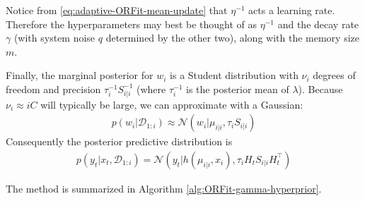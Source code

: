 Notice from \eqref{eq:adaptive-ORFit-mean-update} that $\eta^{-1}$ acts a learning rate. Therefore the hyperparameters may best be thought of as $\eta^{-1}$ and the decay rate $\gamma$ (with system noise $q$ determined by the other two), along with the memory size $m$.

Finally, the marginal posterior for $w_{i}$ is a Student distribution
with $\nu_{i}$ degrees of freedom and precision $\tau_{i}^{-1}S_{i\vert i}^{-1}$
(where $\tau_{i}^{-1}$ is the posterior mean of $\lambda$). Because $\nu_{i}\approx iC$
will typically be large, we can approximate with a Gaussian:
\begin{align}
p\left(w_{i}\vert\mathcal{D}_{1:i}\right)\approx\mathcal{N}\left(w_{i}\vert\mu_{i\vert i},\tau_{i}S_{i\vert i}\right)
\end{align}
Consequently the posterior predictive distribution is
\begin{align}
p\left(y_{t}\vert x_{t},\mathcal{D}_{1:i}\right)=\mathcal{N}\left(y_{t}\vert h\left(\mu_{i\vert i},x_{i}\right),\tau_{i}H_{t}S_{i\vert i}H_{t}^{\top}\right)
\end{align}

The method is summarized in Algorithm \ref{alg:ORFit-gamma-hyperprior}.

